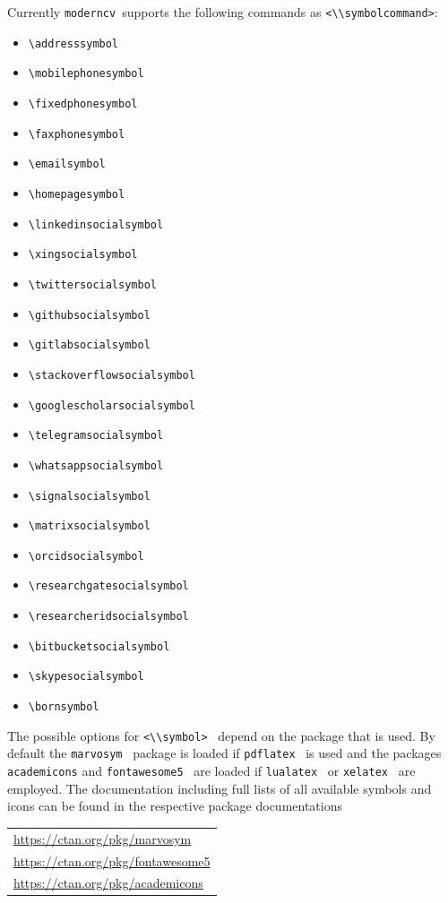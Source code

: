 \documentclass[a4paper,11pt]{article}
\newcommand{\code}[1]{\lstinline!#1!}
\newcommand{\Code}[1]{\lstinline!#1!~} %
\newcommand{\moderncv}{\code{moderncv}}
\begin{document}
Currently \moderncv\ supports the following commands as \code{<\\symbolcommand>}:
\begin{itemize}
  \item \lstinline!\addresssymbol!
  \item \lstinline!\mobilephonesymbol!
  \item \lstinline!\fixedphonesymbol!
  \item \lstinline!\faxphonesymbol!
  \item \lstinline!\emailsymbol!
  \item \lstinline!\homepagesymbol!
  \item \lstinline!\linkedinsocialsymbol!
  \item \lstinline!\xingsocialsymbol!
  \item \lstinline!\twittersocialsymbol!
  \item \lstinline!\githubsocialsymbol!
  \item \lstinline!\gitlabsocialsymbol!
  \item \lstinline!\stackoverflowsocialsymbol!
  \item \lstinline!\googlescholarsocialsymbol!
  \item \lstinline!\telegramsocialsymbol!
  \item \lstinline!\whatsappsocialsymbol!
  \item \lstinline!\signalsocialsymbol!
  \item \lstinline!\matrixsocialsymbol!
  \item \lstinline!\orcidsocialsymbol!
  \item \lstinline!\researchgatesocialsymbol!
  \item \lstinline!\researcheridsocialsymbol!
  \item \lstinline!\bitbucketsocialsymbol!
  \item \lstinline!\skypesocialsymbol!
  \item \lstinline!\bornsymbol!
\end{itemize}
The possible options for \Code{<\\symbol>} depend on the package that is used.
By default the \Code{marvosym} package is loaded if \Code{pdflatex} is used and the packages
\code{academicons} and \Code{fontawesome5} are loaded if \Code{lualatex} or \Code{xelatex} are
employed. The documentation including full lists of all available symbols and icons can be found
in the respective package documentations \medskip

\begin{tabular}{l}
  \url{https://ctan.org/pkg/marvosym}\\[1ex]
  \url{https://ctan.org/pkg/fontawesome5}\\[1ex]
  \url{https://ctan.org/pkg/academicons}
\end{tabular}
\end{document}
